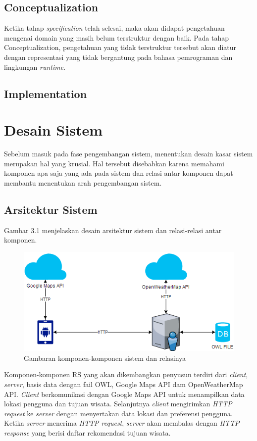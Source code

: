 \subsection{Conceptualization}
Ketika tahap \textit{specification} telah selesai, maka akan didapat pengetahuan mengenai domain yang masih belum terstruktur dengan baik. Pada tahap {Conceptualization}, pengetahuan
yang tidak terstruktur tersebut akan diatur dengan representasi yang tidak bergantung pada bahasa pemrograman dan lingkungan \textit{runtime}\cite{lopez1999building}. 
\subsection{Implementation}

\section{Desain Sistem}
Sebelum masuk pada fase pengembangan sistem, menentukan desain kasar sistem merupakan hal yang krusial. Hal tersebut disebabkan karena memahami komponen apa saja yang ada pada sistem dan relasi antar komponen dapat membantu menentukan arah pengembangan sistem. 
 
\subsection{Arsitektur Sistem}
\par
Gambar 3.1 menjelaskan desain arsitektur sistem dan relasi-relasi antar komponen.
\newline
\begin{figure}[h!]
    \centering
    \includegraphics[scale=0.3]{img/arsitektur_sistem.png}
    \caption{Gambaran komponen-komponen sistem dan relasinya}
    \label{fig:Gambar}
\end{figure}

\par
Komponen-komponen RS yang akan dikembangkan penyusun terdiri dari \textit{client}, \textit{server}, basis data dengan fail OWL, Google Maps API dam OpenWeatherMap API. 
\textit{Client} berkomunikasi dengan Google Maps API untuk menampilkan data lokasi pengguna dan tujuan wisata. Selanjutnya \textit{client} mengirimkan \textit{HTTP request} ke 
\textit{server} dengan menyertakan data lokasi dan preferensi pengguna. Ketika \textit{server} menerima \textit{HTTP request}, \textit{server} akan membalas dengan 
\textit{HTTP response} yang berisi daftar rekomendasi tujuan wisata.

